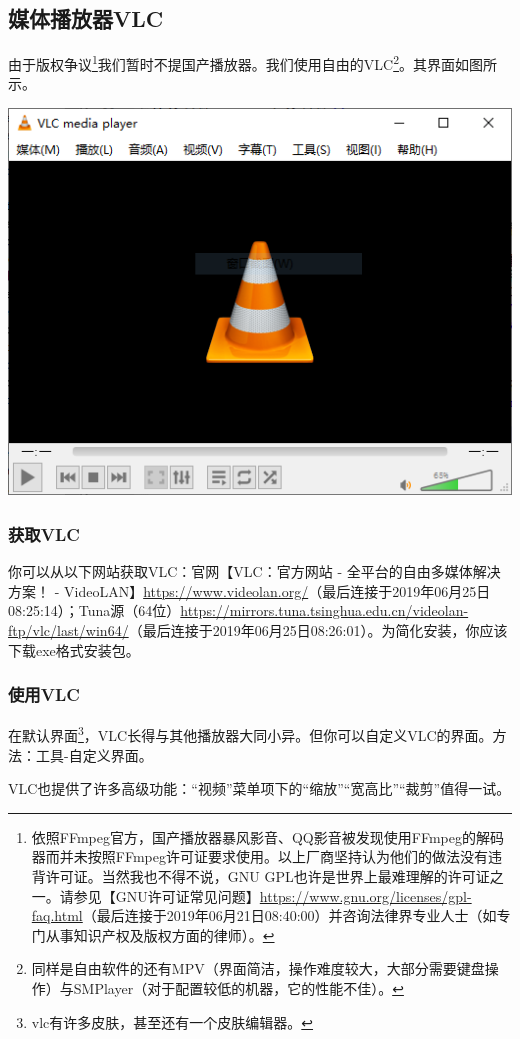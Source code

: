 \documentclass{book}
\begin{document}
\subsection{媒体播放器VLC}
由于版权争议\footnote{依照FFmpeg官方，国产播放器暴风影音、QQ影音被发现使用FFmpeg的解码器而并未按照FFmpeg许可证要求使用。以上厂商坚持认为他们的做法没有违背许可证。当然我也不得不说，GNU GPL也许是世界上最难理解的许可证之一。请参见【GNU许可证常见问题】\url{https://www.gnu.org/licenses/gpl-faq.html}（最后连接于2019年06月21日08:40:00）并咨询法律界专业人士（如专门从事知识产权及版权方面的律师）。}我们暂时不提国产播放器。我们使用自由的VLC\footnote{同样是自由软件的还有MPV（界面简洁，操作难度较大，大部分需要键盘操作）与SMPlayer（对于配置较低的机器，它的性能不佳）。}。其界面如图所示。
\begin{center}
\includegraphics[scale=0.9]{pic/vlc.png}	
\end{center}
\subsubsection{获取VLC}
你可以从以下网站获取VLC：官网【VLC：官方网站 - 全平台的自由多媒体解决方案！ - VideoLAN】\url{https://www.videolan.org/}（最后连接于2019年06月25日08:25:14）；Tuna源（64位）\url{https://mirrors.tuna.tsinghua.edu.cn/videolan-ftp/vlc/last/win64/}（最后连接于2019年06月25日08:26:01）。为简化安装，你应该下载exe格式安装包。
\subsubsection{使用VLC}
在默认界面\footnote{vlc有许多皮肤，甚至还有一个皮肤编辑器。}，VLC长得与其他播放器大同小异。但你可以自定义VLC的界面。方法：工具-自定义界面。\par
VLC也提供了许多高级功能：“视频”菜单项下的“缩放”“宽高比”“裁剪”值得一试。
\end{document}
